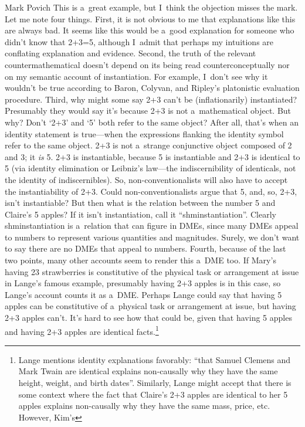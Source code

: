 \begin{artengenv}{Mark Povich}
{This is a~great example, but I~think the objection misses the mark. Let me note four things. First, it is not obvious to me that explanations like this are always bad. It seems like this would be a~good explanation for someone who didn't know that 2+3=5, although I~admit that perhaps my intuitions are conflating explanation and evidence. Second, the truth of the relevant countermathematical doesn't depend on its being read counterconceptually nor on my semantic account of instantiation. For example, I~don't see why it wouldn't be true according to Baron, Colyvan, and Ripley's
\parencite*{baron_how_2017}
platonistic evaluation procedure. Third, why might some say 2+3 can't be (inflationarily) instantiated? Presumably they would say it's because 2+3 is not a~mathematical object. But why? Don't ‘2+3' and ‘5' both refer to the same object? After all, that's when an identity statement is true---when the expressions flanking the identity symbol refer to the same object. 2+3 is not a~strange conjunctive object composed of 2 and 3; it \textit{is} 5. 2+3 is instantiable, because 5 is instantiable and 2+3 is identical to 5 (via identity elimination or Leibniz's law---the indiscernibility of identicals, not the identity of indiscernibles). So, non-}conventionalists will also have to accept the instantiability of 2+3. Could non-conventionalists argue that 5, and, so, 2+3, isn't instantiable? But then what is the relation between the number 5 and Claire's 5 apples? If it isn't instantiation, call it ``shminstantiation''. Clearly shminstantiation is a~relation that can figure in DMEs, since many DMEs appeal to numbers to represent various quantities and magnitudes. Surely, we don't want to say there are no DMEs that appeal to numbers. Fourth, because of the last two points, many other accounts seem to render this a~DME too. If Mary's having 23 strawberries is constitutive of the physical task or arrangement at issue in Lange's
\parencite*{lange_what_2013}
famous example, presumably having 2+3 apples is in this case, so Lange's account counts it as a~DME. Perhaps Lange could say that having 5 apples can be constitutive of a~physical task or arrangement at issue, but having 2+3 apples can't. It's hard to see how that could be, given that having 5 apples and having 2+3 apples are identical facts.\footnote{Lange
\parencite*[][pp.xviii–xix]{lange_because_2016} %
 mentions identity explanations favorably: ``that Samuel Clemens and Mark Twain are identical explains non-causally why they have the same height, weight, and birth dates''. Similarly, Lange might accept that there is some context where the fact that Claire's 2+3 apples are identical to her 5 apples explains non-causally why they have the same mass, price, etc. However, Kim's 
}
\end{artengenv}
